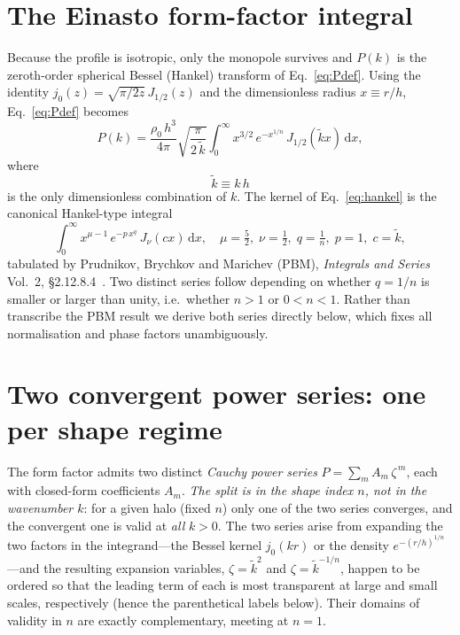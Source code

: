 \documentclass[aps,prd,onecolumn]{revtex4-2}
\newcommand{\kt}{\tilde{k}}          %
\begin{document}
\section{The Einasto form-factor integral}
\label{sec:integral}

Because the profile is isotropic, only the monopole survives and
$P(k)$ is the zeroth-order spherical Bessel (Hankel) transform of
Eq.~\eqref{eq:Pdef}.  Using the identity
$j_0(z)=\sqrt{\pi/2z}\,J_{1/2}(z)$ and the dimensionless radius
$x\equiv r/h$, Eq.~\eqref{eq:Pdef} becomes
\begin{equation}
P(k)=\frac{\rho_0\,h^3}{4\pi}\sqrt{\frac{\pi}{2\,\kt}}
     \int_0^\infty\! x^{3/2}\,e^{-x^{1/n}}\,J_{1/2}(\kt x)\,\mathrm{d}x ,
\label{eq:hankel}
\end{equation}
where
\begin{equation}
\kt\equiv k\,h
\label{eq:ktilde}
\end{equation}
is the only dimensionless combination of $k$.  The kernel of
Eq.~\eqref{eq:hankel} is the canonical Hankel-type integral
\begin{equation}
\int_0^\infty x^{\mu-1}\,e^{-p\,x^{q}}\,J_\nu(cx)\,\mathrm{d}x,
\quad
\mu=\tfrac52,\;\nu=\tfrac12,\;q=\tfrac1n,\;p=1,\;c=\kt ,
\label{eq:canonical}
\end{equation}
tabulated by Prudnikov, Brychkov and Marichev (PBM),
\emph{Integrals and Series} Vol.~2, \S2.12.8.4~\cite{PBM2}.  Two distinct
series follow depending on whether $q=1/n$ is smaller or larger than
unity, i.e.\ whether $n>1$ or $0<n<1$.  Rather than transcribe the PBM
result we derive both series directly below, which fixes all
normalisation and phase factors unambiguously.

\section{Two convergent power series: one per shape regime}
\label{sec:series}

The form factor admits two distinct \emph{Cauchy power series}
$P=\sum_m A_m\,\zeta^{\,m}$, each with closed-form coefficients $A_m$.
\emph{The split is in the shape index $n$, not in the wavenumber $k$}: for
a given halo (fixed $n$) only one of the two series converges, and the
convergent one is valid at \emph{all} $k>0$.  The two series arise from
expanding the two factors in the integrand---the Bessel kernel $j_0(kr)$
or the density $e^{-(r/h)^{1/n}}$---and the resulting expansion variables,
$\zeta=\kt^2$ and $\zeta=\kt^{-1/n}$, happen to be ordered so that the
leading term of each is most transparent at large and small scales,
respectively (hence the parenthetical labels below).  Their domains of
validity in $n$ are exactly complementary, meeting at $n=1$.
\end{document}
